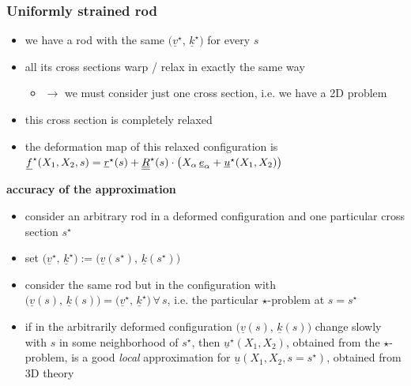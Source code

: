 \begin{frame}
  \frametitle{Uniformly strained rod}
  \vspace{-0.4em}
  \begin{itemize}
    \item we have a rod with the same $\bigl( \underline{v}^{\star}, \, \underline{k}^{\star} \bigr)$ for every $s$
    \item all its cross sections warp / relax in exactly the same way
      \begin{itemize}
        \item $\rightarrow$ we must consider just one cross section, i.e. we have a 2D problem
      \end{itemize}
    \item this cross section is completely relaxed
    \item the deformation map of this relaxed configuration is $\underline{f}^{\star}(X_1,X_2,s) = \underline{r}^{\star}(s) + \underline{\underline{R}}^{\star}(s) \cdot \bigl( X_{\alpha} \, \underline{e}_{\alpha} + \underline{u}^{\star}(X_1,X_2) \bigr)$
  \end{itemize}
  
  \vspace{0.7em}
  \textbf{accuracy of the approximation}
  \begin{itemize}
    \item consider an arbitrary rod in a deformed configuration and one particular cross section $s^{\star}$
    \item set $\bigl( \underline{v}^{\star}, \, \underline{k}^{\star} \bigr) := \bigl( \underline{v}(s^{\star}), \, \underline{k}(s^{\star}) \bigr)$
    \item consider the same rod but in the configuration with $\bigl( \underline{v}(s), \, \underline{k}(s) \bigr) = \bigl( \underline{v}^{\star}, \, \underline{k}^{\star} \bigr) \, \forall \, s$, \newline i.e. the particular $\star$-problem at $s=s^{\star}$
    \item if in the arbitrarily deformed configuration $\bigl( \underline{v}(s), \, \underline{k}(s) \bigr)$ change slowly with $s$ in some neighborhood of $s^{\star}$, then $\underline{u}^{\star}(X_1,X_2)$, obtained from the $\star$-problem, is a good \textit{local} approximation for $\underline{u}(X_1,X_2,s=s^{\star})$, obtained from 3D theory
  \end{itemize}
\end{frame}


